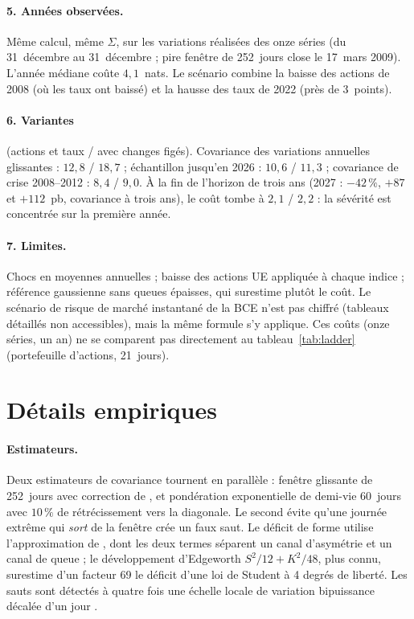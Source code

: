 \documentclass[11pt]{article}
\theoremstyle{definition}
\begin{document}
\paragraph{5. Années observées.} Même calcul, même $\Sigma$, sur les
variations réalisées des onze séries (du 31~décembre au 31~décembre ; pire
fenêtre de 252~jours close le 17~mars 2009). L'année médiane coûte
$4{,}1$~nats. Le scénario combine la baisse des actions de 2008 (où les taux
ont baissé) et la hausse des taux de 2022 (près de $3$~points).

\paragraph{6. Variantes} (actions et taux / avec changes figés). Covariance
des variations annuelles glissantes : $12{,}8$ / $18{,}7$ ; échantillon
jusqu'en 2026 : $10{,}6$ / $11{,}3$ ; covariance de crise 2008--2012 :
$8{,}4$ / $9{,}0$. À la fin de l'horizon de trois ans (2027 : $-42\,\%$,
$+87$ et $+112$~pb, covariance à trois ans), le coût tombe à $2{,}1$ /
$2{,}2$ : la sévérité est concentrée sur la première année.

\paragraph{7. Limites.} Chocs en moyennes annuelles ; baisse des actions UE
appliquée à chaque indice ; référence gaussienne sans queues épaisses, qui
surestime plutôt le coût. Le scénario de risque de marché instantané de la BCE
n'est pas chiffré (tableaux détaillés non accessibles), mais la même formule
s'y applique. Ces coûts (onze séries, un an) ne se comparent pas directement
au tableau~\ref{tab:ladder} (portefeuille d'actions, 21~jours).

\section{Détails empiriques}
\label{app:details}

\paragraph{Estimateurs.} Deux estimateurs de covariance tournent en parallèle :
fenêtre glissante de 252~jours avec correction de \citet{ledoit2004}, et
pondération exponentielle de demi-vie 60~jours avec $10\,\%$ de rétrécissement
vers la diagonale. Le second évite qu'une journée extrême qui \emph{sort} de la
fenêtre crée un faux saut. Le déficit de forme utilise l'approximation de
\citet{hyvarinen1998}, dont les deux termes séparent un canal d'asymétrie et un
canal de queue ; le développement d'Edgeworth $S^2/12+K^2/48$, plus connu,
surestime d'un facteur 69 le déficit d'une loi de Student à 4 degrés de
liberté. Les sauts sont détectés à quatre fois une échelle locale de variation
bipuissance décalée d'un jour \citep{bns2004}.
\end{document}
